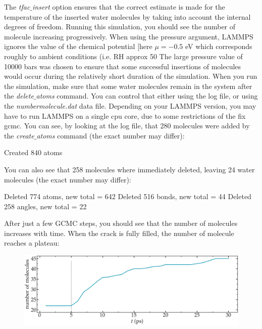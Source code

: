 \noindent The \textit{tfac$\_$insert} option ensures that the correct estimate is
made for the temperature of the inserted water molecules by
taking into account the internal degrees of freedom. Running
this simulation, you should see the number of molecule
increasing progressively. When using the pressure argument,
LAMMPS ignores the value of the chemical potential [here $\mu = -0.5$ eV
which corresponds roughly to ambient conditions (i.e. RH approx 50%
The large pressure value of 10000 bars was chosen to ensure that 
some successful insertions of molecules would occur during the 
relatively short duration of the simulation.
When you run the simulation, make sure that some water molecules 
remain in the system after the \textit{delete$\_$atoms} command. You can control 
that either using the log file, or using the \textit{numbermolecule.dat} data file.
Depending on your LAMMPS version, you may have to run LAMMPS
on a single cpu core, due to some restrictions of the fix gcmc.
You can see, by looking at the log file, that 280 molecules
were added by the \textit{create$\_$atoms} command (the exact number may differ):

\begin{lcverbatim}
Created 840 atoms
\end{lcverbatim}

\noindent You can also see that 258 molecules where immediately deleted,
leaving 24 water molecules (the exact number may differ):

\begin{lcverbatim}
Deleted 774 atoms, new total = 642
Deleted 516 bonds, new total = 44
Deleted 258 angles, new total = 22
\end{lcverbatim}

\noindent After just a few GCMC steps, you should see that the number of molecules increases with time.
When the crack is fully filled, the number of molecule reaches a plateau:

\begin{figure}
\includegraphics[width=\linewidth]{tutorials/level3/water-adsorption-in-silica/number_evolution-light.png}
\end{figure}

